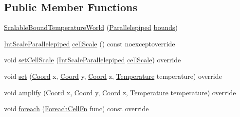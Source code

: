 \subsection*{Public Member Functions}
\begin{DoxyCompactItemize}
\item 
\hyperlink{class_scalable_bound_temperature_world_a70e95f32bc19f298649ac99d0b69068c}{Scalable\-Bound\-Temperature\-World} (\hyperlink{struct_parallelepiped}{Parallelepiped} \hyperlink{class_bound_temperature_world_a3351693a7d184365da5dfb5d833a0cb6}{bounds})
\item 
\hyperlink{struct_int_scale_parallelepiped}{Int\-Scale\-Parallelepiped} \hyperlink{class_scalable_bound_temperature_world_a9ac7291c4a2ff3d60042c518f1ae2858}{cell\-Scale} () const noexceptoverride
\item 
void \hyperlink{class_scalable_bound_temperature_world_addf3187d106391375b4453614a84563b}{set\-Cell\-Scale} (\hyperlink{struct_int_scale_parallelepiped}{Int\-Scale\-Parallelepiped} \hyperlink{class_scalable_bound_temperature_world_a9ac7291c4a2ff3d60042c518f1ae2858}{cell\-Scale}) override
\item 
void \hyperlink{class_scalable_bound_temperature_world_ade4ecf303ae025e824c0bd5ecd2e2ca7}{set} (\hyperlink{struct_coord}{Coord} x, \hyperlink{struct_coord}{Coord} y, \hyperlink{struct_coord}{Coord} z, \hyperlink{struct_temperature}{Temperature} temperature) override
\item 
void \hyperlink{class_scalable_bound_temperature_world_ab9602b36759aa857910e03856344759d}{amplify} (\hyperlink{struct_coord}{Coord} x, \hyperlink{struct_coord}{Coord} y, \hyperlink{struct_coord}{Coord} z, \hyperlink{struct_temperature}{Temperature} temperature) override
\item 
void \hyperlink{class_scalable_bound_temperature_world_a57f60178c88b2cffca11a7f21c5c11c7}{foreach} (\hyperlink{class_i_temperature_world_boundable_mixin_a370c20d79642d15e97843da972d87ba9}{Foreach\-Cell\-Fn} func) const override
\end{DoxyCompactItemize}
